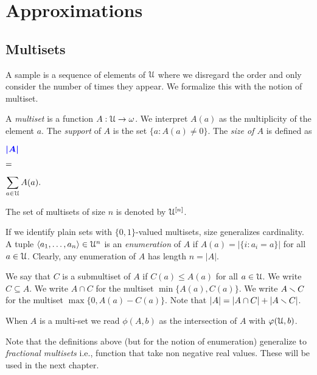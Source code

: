 \documentclass[sputnik.tex]{subfiles}
\begin{document}
\def\Fr{\mathop{\rm Fr}}

\def\vc{{\footnotesize VC}}
\def\nip{{\footnotesize NIP}}


\def\medrel#1{\parbox[t]{6ex}{$\displaystyle\hfil #1$}}
\def\ceq#1#2#3{\parbox[t]{25ex}{$\displaystyle #1$}\medrel{#2}{$\displaystyle #3$}}



\chapter{Approximations}


\section{Multisets}\label{multisets}

A sample is a sequence of elements of $\EuScript U$ where we disregard the order and only consider the number of times they appear.
We formalize this with the notion of multiset. 

A \emph{multiset\/} is a function $A:\EuScript U\to\omega$.
We interpret $A(a)$ as the multiplicity of the element $a$.
The \emph{support\/} of $A$ is the set $\{a:A(a)\neq0\}$.
The \emph{size of $A$\/} is defined as

\ceq{\hfill\emph{$|A|$}}{=}{\sum_{a\in\U} A(a).}

The set of multisets of size $n$ is denoted by \emph{$\EuScript U^{[n]}$}.

If we identify plain sets with $\{0,1\}$-valued multisets, size generalizes cardinality.
A tuple $\langle a_1,\dots,a_n\rangle\in\EuScript U^n$ is an \emph{enumeration\/} of $A$ if $A(a)=\big|\{i:a_i=a\}\big|$ for all $a\in\EuScript U$.
Clearly, any enumeration of $A$ has length $n=|A|$.

We say that $C$ is a submultiset of $A$ if $C(a)\le A(a)$ for all $a\in\EuScript U$.
We write \emph{$C\subseteq A$}.
We write \emph{$A\cap C$\/} for the multiset $\min\{A(a),C(a)\}$.
We write \emph{$A\smallsetminus C$\/} for the multiset $\max\{0,A(a)-C(a)\}$.
Note that $|A|=|A\cap C|+|A\smallsetminus C|$.

When $A$ is a multi-set we read \emph{$\phi(A,b)$\/} as the intersection of $A$ with $\varphi(\EuScript U,b)$.

Note that the definitions above (but for the notion of enumeration) generalize to \emph{fractional multisets\/} i.e.,  function that take non negative real values. These will be used in the next chapter.  
\end{document}
